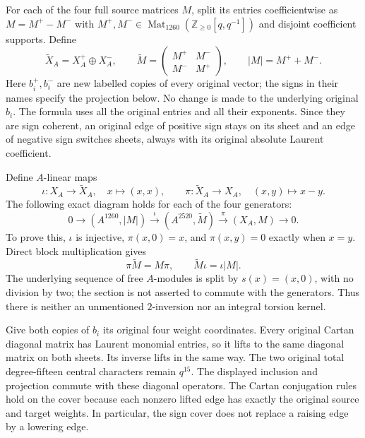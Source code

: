 For each of the four full source matrices $M$, split its entries
coefficientwise as $M=M^+-M^-$ with
$M^+,M^-\in\operatorname{Mat}_{1260}(\mathbb Z_{\geq0}[q,q^{-1}])$
and disjoint coefficient supports. Define
\begin{equation}\label{eq:positive-source-cover-matrices}
 \widetilde X_A=X_A^+\oplus X_A^-,\qquad
 \widetilde M=\begin{pmatrix}M^+&M^-\\M^-&M^+\end{pmatrix},
 \qquad |M|=M^++M^-.
\end{equation}
Here $b_i^+,b_i^-$ are new labelled copies of every original vector;
the signs in their names specify the projection below. No change is
made to the underlying original $b_i$. The formula uses all the
original entries and all their exponents. Since they are sign coherent,
an original edge of positive sign stays on its sheet and an edge of
negative sign switches sheets, always with its original absolute
Laurent coefficient.

Define $A$-linear maps
\[
 \iota:X_A\longrightarrow\widetilde X_A,\quad
       x\longmapsto(x,x),\qquad
 \pi:\widetilde X_A\longrightarrow X_A,\quad
       (x,y)\longmapsto x-y.
\]
The following exact diagram holds for each of the four generators:
\begin{equation}\label{eq:positive-source-cover-exact}
 0\longrightarrow (A^{1260},|M|)
 \xrightarrow{\ \iota\ }(A^{2520},\widetilde M)
 \xrightarrow{\ \pi\ }(X_A,M)\longrightarrow0.
\end{equation}
To prove this, $\iota$ is injective, $\pi(x,0)=x$, and
$\pi(x,y)=0$ exactly when $x=y$. Direct block multiplication gives
\[
 \pi\widetilde M=M\pi,\qquad
 \widetilde M\iota=\iota|M|.
\]
The underlying sequence of free $A$-modules is split by
$s(x)=(x,0)$, with no division by two; the section is not asserted
to commute with the generators. Thus there is neither an unmentioned
$2$-inversion nor an integral torsion kernel.

Give both copies of $b_i$ its original four weight coordinates.
Every original Cartan diagonal matrix has Laurent monomial entries,
so it lifts to the same diagonal matrix on both sheets. Its inverse
lifts in the same way. The two original total degree-fifteen central
characters remain $q^{15}$. The displayed inclusion and projection
commute with these diagonal operators. The Cartan conjugation rules
hold on the cover because each nonzero lifted edge has exactly the
original source and target weights. In particular, the sign cover
does not replace a raising edge by a lowering edge.

